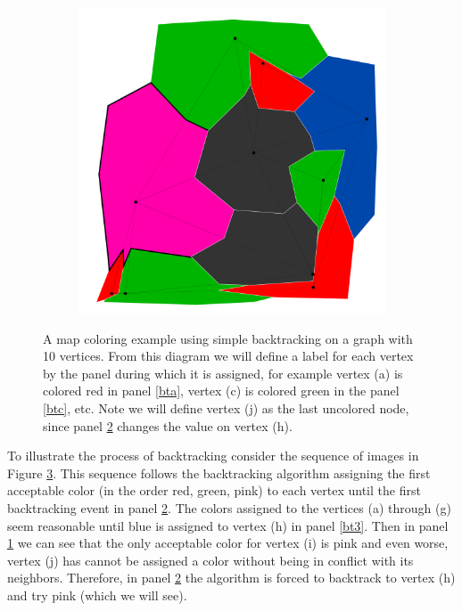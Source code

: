\documentclass{article}
\begin{document}
\begin{figure}[h!]
\begin{subfigure}{0.18\textwidth}
				\caption{}
				\label{bt4}
			\end{subfigure}
			\;
			\begin{subfigure}{0.18\textwidth}
				\centering
				\includegraphics[width=\textwidth]{images/sequences/simple_backtracking/bt_simple_I00024}
				\caption{}
				\label{bt5}
			\end{subfigure}

			\caption{A map coloring example using simple backtracking on a graph with 10 vertices. From this diagram we will define a label for each vertex by the panel during which it is assigned, for example vertex (a) is colored red in panel \ref{bta}, vertex (c) is colored green in the panel \ref{btc}, etc. Note we will define vertex (j) as the last uncolored node, since panel \ref{bt5} changes the value on vertex (h).}
			\label{simple_ex}
		\end{figure}	
		
		To illustrate the process of backtracking consider the sequence of images in Figure \ref{simple_ex}.
		This sequence follows the backtracking algorithm assigning the first acceptable color (in the order red, green, pink) to each vertex until the first backtracking event in panel \ref{bt5}. The colors assigned to the vertices (a) through (g) seem reasonable until blue is assigned to vertex (h) in panel \ref{bt3}. Then in panel \ref{bt4} we can see that the only acceptable color for vertex (i) is pink and even worse, vertex (j) has cannot be assigned a color without being in conflict with its neighbors. Therefore, in panel \ref{bt5} the algorithm is forced to backtrack to vertex (h) and try pink (which we will see).
		
\end{document}
